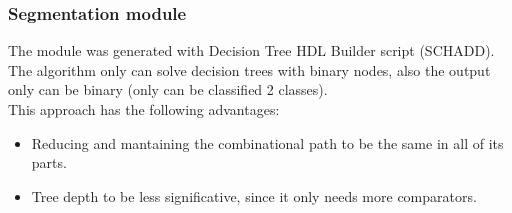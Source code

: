 \documentclass[
serif,
compress,
xcolor=table,
dvipsnames,
]{beamer}
\begin{document}
%

%    
%
%


\begin{frame}
\frametitle{Segmentation module}
    
    The module was generated with Decision Tree HDL Builder script (SCHADD). The algorithm only can solve decision trees with binary nodes, also the output only can be binary (only can be classified 2 classes).\\ 
    
    This approach has the following advantages:\\
    
    \begin{itemize}
    
    \item Reducing and mantaining the combinational path to be the same in all of its parts.
    
    \item Tree depth to be less significative, since it only needs more comparators.\\
    
    \end{itemize}

    
\end{frame}
\end{document}
